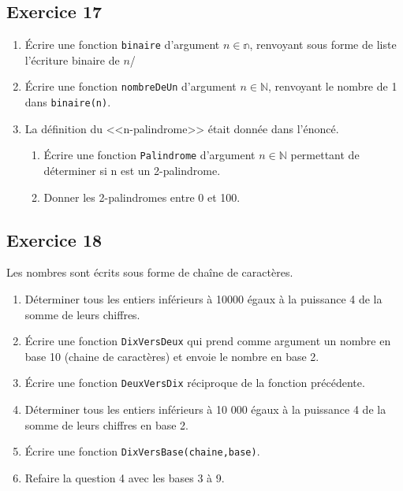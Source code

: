 \documentclass[10pt,fleqn]{article} %
\begin{document}
\begin{multicols}{2}
\subsection*{Exercice 17}
\begin{enumerate}
\item Écrire une fonction \texttt{binaire} d'argument $n\in\mathbb{n}$, renvoyant sous forme de liste l'écriture binaire de $n$/
\item Écrire une fonction \texttt{nombreDeUn} d'argument $n\in \mathbb{N}$, renvoyant le nombre de 1 dans \texttt{binaire(n)}. 
\item La définition du <<n-palindrome>> était donnée dans l'énoncé.
\begin{enumerate}
\item Écrire une fonction \texttt{Palindrome} d'argument $n\in \mathbb{N}$ permettant de déterminer si n est un 2-palindrome.
\item Donner les 2-palindromes entre 0 et 100.
\end{enumerate}
\end{enumerate}



\subsection*{Exercice 18}
Les nombres sont écrits sous forme de chaîne de caractères.
\begin{enumerate}
\item Déterminer tous les entiers inférieurs à 10000 égaux à la puissance 4 de la somme de leurs chiffres.
\item Écrire une fonction \texttt{DixVersDeux} qui prend comme argument un nombre en base 10 (chaine de caractères) et envoie le nombre en base 2. 
\item Écrire une fonction \texttt{DeuxVersDix} réciproque de la fonction précédente. 
\item Déterminer tous les entiers inférieurs à 10 000 égaux à la puissance 4 de la somme de leurs chiffres en base 2.
\item Écrire une fonction  \texttt{DixVersBase(chaine,base)}. 
\item Refaire la question 4 avec les bases 3 à 9.
\end{enumerate}


\end{multicols}
\end{document}
